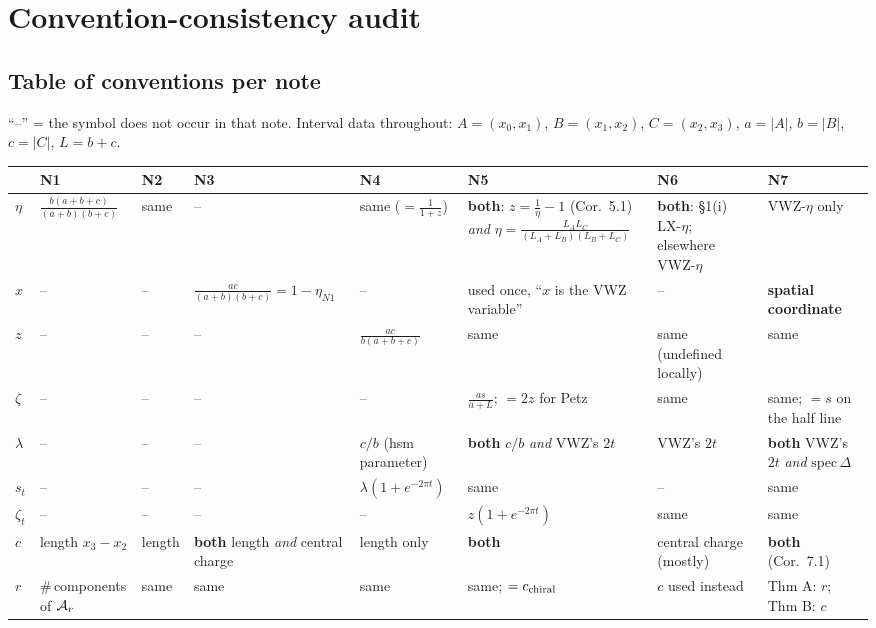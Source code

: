 \documentclass[11pt]{article}
\newcommand{\NI}{N1}\newcommand{\NII}{N2}\newcommand{\NIII}{N3}
\newcommand{\NIV}{N4}\newcommand{\NV}{N5}\newcommand{\NVI}{N6}\newcommand{\NVII}{N7}
\newcommand{\zz}{\zeta}
\begin{document}
\clearpage
\section{Convention-consistency audit}

\subsection{Table of conventions per note}
``--'' = the symbol does not occur in that note.  Interval data throughout: $A=(x_0,x_1)$, $B=(x_1,x_2)$,
$C=(x_2,x_3)$, $a=|A|$, $b=|B|$, $c=|C|$, $L=b+c$.

\begin{center}\scriptsize
\setlength{\tabcolsep}{3pt}\renewcommand{\arraystretch}{1.22}
\begin{tabular}{@{}L{0.115\textwidth}L{0.105\textwidth}L{0.105\textwidth}L{0.105\textwidth}L{0.115\textwidth}L{0.135\textwidth}L{0.105\textwidth}L{0.115\textwidth}@{}}
\toprule
& \textbf{\NI} & \textbf{\NII} & \textbf{\NIII} & \textbf{\NIV} & \textbf{\NV} & \textbf{\NVI} & \textbf{\NVII}\\
\midrule
$\eta$
& $\frac{b(a+b+c)}{(a+b)(b+c)}$
& same
& --
& same ($=\frac1{1+z}$)
& \textbf{both}: $z=\frac1\eta-1$ (Cor.\ 5.1) \emph{and} $\eta=\frac{L_AL_C}{(L_A+L_B)(L_B+L_C)}$
& \textbf{both}: \S1(i) LX-$\eta$; elsewhere VWZ-$\eta$
& VWZ-$\eta$ only\\
$x$ & -- & -- & $\frac{ac}{(a+b)(b+c)}=1-\eta_{\NI}$ & -- & used once, ``$x$ is the VWZ variable'' & -- & \textbf{spatial coordinate}\\
$z$ & -- & -- & -- & $\frac{ac}{b(a+b+c)}$ & same & same (undefined locally) & same\\
$\zz$ & -- & -- & -- & -- & $\frac{as}{a+L}$; $=2z$ for Petz & same & same; $=s$ on the half line\\
$\lambda$ & -- & -- & -- & $c/b$ (hsm parameter) & \textbf{both} $c/b$ \emph{and} VWZ's $2t$ & VWZ's $2t$ & \textbf{both} VWZ's $2t$ \emph{and} $\mathrm{spec}\,\Delta$\\
$s_t$ & -- & -- & -- & $\lambda(1+e^{-2\pi t})$ & same & -- & same\\
$\zz_t$ & -- & -- & -- & -- & $z(1+e^{-2\pi t})$ & same & same\\
$c$ & length $x_3{-}x_2$ & length & \textbf{both} length \emph{and} central charge & length only & \textbf{both} & central charge (mostly) & \textbf{both} (Cor.\ 7.1)\\
$r$ & \#\,components of $\mathcal A_r$ & same & same & same & same; $=c_{\rm chiral}$ & $c$ used instead & Thm A: $r$; Thm B: $c$\\

\end{tabular}
\end{center}
\end{document}
